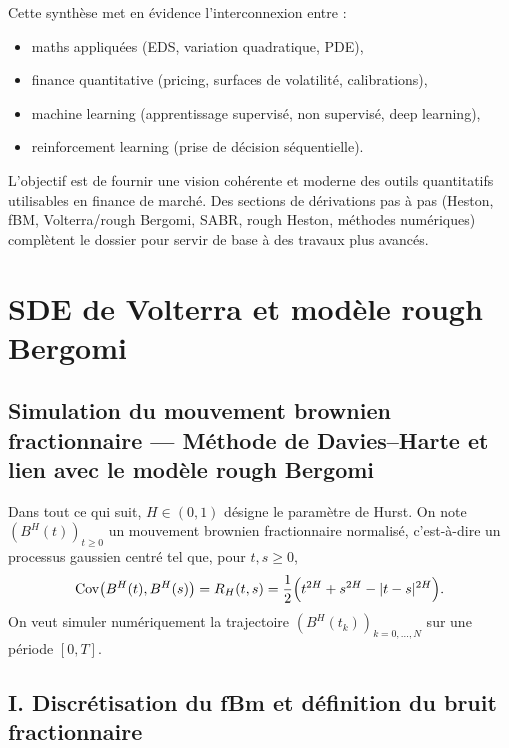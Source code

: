 \documentclass[11pt,a4paper]{article}
\newcommand{\Cov}{\mathrm{Cov}}
\newcommand{\1}{\mathbf{1}}
\newcommand{\bH}{B^{H}}
\begin{document}
Cette synthèse met en évidence l'interconnexion entre :

\begin{itemize}
  \item maths appliquées (EDS, variation quadratique, PDE),
  \item finance quantitative (pricing, surfaces de volatilité, calibrations),
  \item machine learning (apprentissage supervisé, non supervisé, deep learning),
  \item reinforcement learning (prise de décision séquentielle).
\end{itemize}

L'objectif est de fournir une vision cohérente et moderne des outils quantitatifs
utilisables en finance de marché.
Des sections de d\'erivations pas \`a pas (Heston, fBM, Volterra/rough Bergomi, SABR, rough Heston,
m\'ethodes num\'eriques) compl\`etent le dossier pour servir de base \`a des travaux plus avanc\'es.


\section{SDE de Volterra et mod\`ele rough Bergomi}
\label{sec:deriv-rbergomi}



\subsection*{Simulation du mouvement brownien fractionnaire --- Méthode de Davies--Harte et lien avec le modèle rough Bergomi}

Dans tout ce qui suit, $H\in(0,1)$ désigne le paramètre de Hurst.
On note $(\bH(t))_{t\ge 0}$ un mouvement brownien fractionnaire
normalisé, c'est-à-dire un processus gaussien centré tel que, pour
$t,s\ge 0$,
\begin{equation}
  \label{eq:cov-fBm}
  \Cov\bigl(\bH(t),\bH(s)\bigr)
  = R_H(t,s)
  = \frac{1}{2}\Bigl(t^{2H} + s^{2H} - |t-s|^{2H}\Bigr).
\end{equation}
On veut simuler numériquement la trajectoire
$(\bH(t_k))_{k=0,\dots,N}$ sur une période $[0,T]$.

\subsection*{I. Discrétisation du fBm et définition du bruit fractionnaire}
\end{document}

